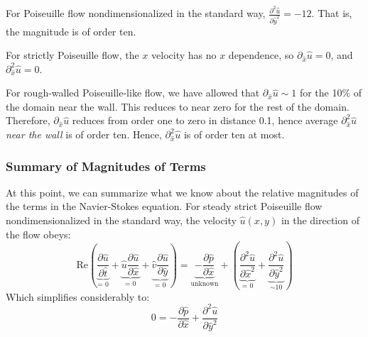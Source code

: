 \documentclass[12pt, a4paper, twoside, openright]{book}
\begin{document}
For Poiseuille flow nondimensionalized in the standard way, $ \frac{\partial^2 \hat{u}}{\partial \hat{y}^2} = -12$.  That is, the magnitude is of order ten.

For strictly Poiseuille flow, the $x$ velocity has no $x$ dependence, so $\partial_{\hat{x}} \hat{u} = 0 $, and $ \partial^2_{\hat{x}} \hat{u} = 0 $.

For rough-walled Poiseuille-like flow, we have allowed that $\partial_{\hat{x}} \hat{u} \sim 1$ for the 10\% of the domain near the wall.  This reduces to near zero for the rest of the domain.  Therefore, $\partial_{\hat{x}} \hat{u}$ reduces from order one to zero in distance 0.1, hence average $ \partial^2_{\hat{x}} \hat{u}$ \emph{near the wall} is of order ten.  
Hence, $ \partial^2_{\hat{x}} \hat{u}$ is of order ten at most.


\subsubsection{Summary of Magnitudes of Terms}

At this point, we can summarize what we know about the relative magnitudes of the terms in the Navier-Stokes equation.  For steady strict Poiseuille flow nondimensionalized in the standard way, the velocity $\hat{u}(x,y)$ in the direction of the flow obeys:
\begin{equation}
\mathrm{Re} \left( 
\underbrace{ \frac{\partial \hat{u}}{\partial \hat{t}} }_{\text{= 0}} +
\underbrace{ \hat{u} \frac{\partial \hat{u}}{\partial \hat{x}} }_{\text{= 0}} +
\underbrace{ \hat{v} \frac{\partial \hat{u}}{\partial \hat{y}} }_{\text{= 0}} 
\right) = 
\underbrace{ - \frac{\partial \hat{p}}{\partial \hat{x}} }_{\text{unknown}}
  + \left( 
\underbrace{ \frac{\partial^2 \hat{u}}{\partial \hat{x}^2} }_{\text{= 0}} + 
\underbrace{ \frac{\partial^2 \hat{u}}{\partial \hat{y}^2} }_{\sim 10} 
\right)
\end{equation}
Which simplifies considerably to:
\begin{equation}
0 = -  \frac{\partial \hat{p}}{\partial \hat{x}} + 
\frac{\partial^2 \hat{u}}{\partial \hat{y}^2} %
\end{equation}
\end{document}
